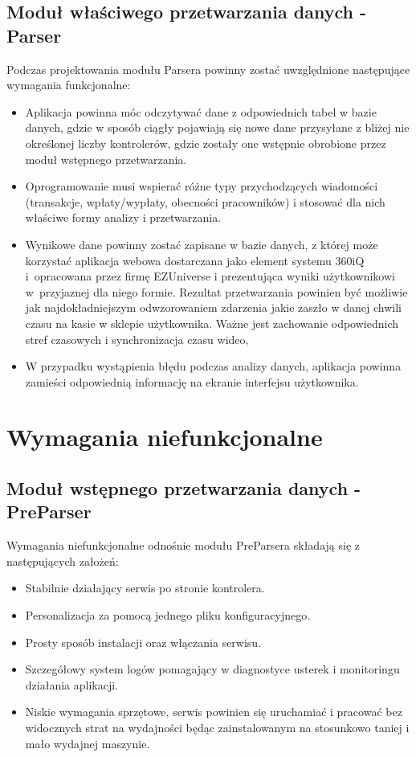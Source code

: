 \documentclass[a4paper]{book}
\begin{document}
\subsection{Moduł właściwego przetwarzania danych - Parser}
Podczas projektowania modułu Parsera powinny zostać uwzględnione następujące wymagania funkcjonalne:
\begin{itemize}
	\item Aplikacja powinna móc odczytywać dane z odpowiednich tabel w bazie danych, gdzie w sposób ciągły pojawiają się nowe dane przysyłane z bliżej nie określonej liczby kontrolerów, gdzie zostały one wstępnie obrobione przez moduł wstępnego przetwarzania.
	\item Oprogramowanie musi wspierać różne typy przychodzących wiadomości (transakcje, wpłaty/wypłaty, obecności pracowników) i stosować dla nich właściwe formy analizy i przetwarzania.
	\item Wynikowe dane powinny zostać zapisane w bazie danych, z której może korzystać aplikacja webowa dostarczana jako element systemu 360iQ i~opracowana przez firmę EZUniverse i prezentująca wyniki użytkownikowi w~przyjaznej dla niego formie. Rezultat przetwarzania powinien być możliwie jak najdokładniejszym odwzorowaniem zdarzenia jakie zaszło w danej chwili czasu na kasie w sklepie użytkownika. Ważne jest zachowanie odpowiednich stref czasowych i synchronizacja czasu wideo,
	\item W przypadku wystąpienia błędu podczas analizy danych, aplikacja powinna zamieści odpowiednią informację na ekranie interfejsu użytkownika.
\end{itemize}
\section{Wymagania niefunkcjonalne}
\subsection{Moduł wstępnego przetwarzania danych - PreParser}
Wymagania niefunkcjonalne odnośnie modułu PreParsera składają się z następujących założeń:
\begin{itemize}
	\item Stabilnie działający serwis po stronie kontrolera.
	\item Personalizacja za pomocą jednego pliku konfiguracyjnego.
	\item Prosty sposób instalacji oraz włączania serwisu.
	\item Szczegółowy system logów pomagający w diagnostyce usterek i monitoringu działania aplikacji.
	\item Niskie wymagania sprzętowe, serwis powinien się uruchamiać i pracować bez widocznych strat na wydajności będąc zainstalowanym na stosunkowo taniej i mało wydajnej maszynie.
\end{itemize}
\end{document}
